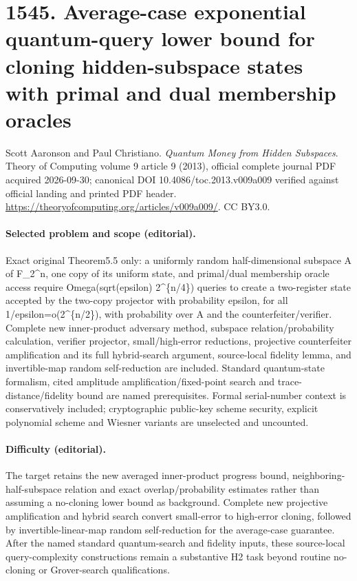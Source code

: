 \documentclass[10pt]{article}
\theoremstyle{definition}
\numberwithin{equation}{section}
\begin{document}
\begingroup\raggedright
\section*{1545. Average-case exponential quantum-query lower bound for cloning hidden-subspace states with primal and dual membership oracles}
Scott Aaronson and Paul Christiano. \emph{Quantum Money from Hidden Subspaces}. Theory of Computing volume 9 article 9 (2013), official complete journal PDF acquired 2026-09-30; canonical DOI 10.4086/toc.2013.v009a009 verified against official landing and printed PDF header. \url{https://theoryofcomputing.org/articles/v009a009/}. CC BY3.0.
\paragraph{Selected problem and scope (editorial).} Exact original Theorem5.5 only: a uniformly random half-dimensional subspace A of F\_2\textasciicircum{}n, one copy of its uniform state, and primal/dual membership oracle access require Omega(sqrt(epsilon) 2\textasciicircum{}\{n/4\}) queries to create a two-register state accepted by the two-copy projector with probability epsilon, for all 1/epsilon=o(2\textasciicircum{}\{n/2\}), with probability over A and the counterfeiter/verifier. Complete new inner-product adversary method, subspace relation/probability calculation, verifier projector, small/high-error reductions, projective counterfeiter amplification and its full hybrid-search argument, source-local fidelity lemma, and invertible-map random self-reduction are included. Standard quantum-state formalism, cited amplitude amplification/fixed-point search and trace-distance/fidelity bound are named prerequisites. Formal serial-number context is conservatively included; cryptographic public-key scheme security, explicit polynomial scheme and Wiesner variants are unselected and uncounted.
\paragraph{Difficulty (editorial).} The target retains the new averaged inner-product progress bound, neighboring-half-subspace relation and exact overlap/probability estimates rather than assuming a no-cloning lower bound as background. Complete new projective amplification and hybrid search convert small-error to high-error cloning, followed by invertible-linear-map random self-reduction for the average-case guarantee. After the named standard quantum-search and fidelity inputs, these source-local query-complexity constructions remain a substantive H2 task beyond routine no-cloning or Grover-search qualifications.
\end{document}
